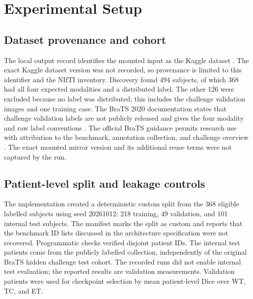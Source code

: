 \documentclass[conference]{IEEEtran}
\begin{document}
\section{Experimental Setup}
\subsection{Dataset provenance and cohort}
The local output record identifies the mounted input as the Kaggle dataset . The exact Kaggle dataset version was not recorded, so provenance is limited to this identifier and the NIfTI inventory. Discovery found 494 subjects, of which 368 had all four expected modalities and a distributed label. The other 126 were excluded because no label was distributed; this includes the challenge validation images and one training case. The BraTS 2020 documentation states that challenge validation labels are not publicly released and gives the four modality and raw label conventions \cite{brats2020data}. The official BraTS guidance permits research use with attribution to the benchmark, annotation collection, and challenge overview \cite{menze2015,bakas2017,bakas2018challenge}. The exact mounted mirror version and its additional reuse terms were not captured by the run.

\subsection{Patient-level split and leakage controls}
The implementation created a deterministic custom split from the 368 eligible labelled subjects using seed 20261012: 218 training, 49 validation, and 101 internal test subjects. The manifest marks the split as custom and reports that the benchmark ID lists discussed in the architecture specification were not recovered. Programmatic checks verified disjoint patient IDs. The internal test patients come from the publicly labelled collection, independently of the original BraTS hidden challenge test cohort. The recorded runs did not enable internal test evaluation; the reported results are validation measurements. Validation patients were used for checkpoint selection by mean patient-level Dice over WT, TC, and ET.
\end{document}
